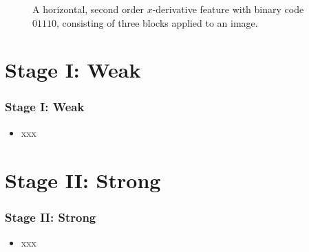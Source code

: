 \documentclass{beamer}
\begin{document}
\frame
{
	\begin{figure}[!ht]
		\centering
		\caption{A horizontal, second order $x$-derivative feature with binary code
		$01110$, consisting of three blocks applied to an image.}
		\label{fig:feature}
	\end{figure}
}

\section{Stage I: Weak}
\frame
{
  \frametitle{Stage I: Weak}
	
  \begin{itemize}
  \item <+-| alert@+> xxx
  \end{itemize}
}

\section{Stage II: Strong}
\frame
{
  \frametitle{Stage II: Strong}
	
  \begin{itemize}
  \item <+-| alert@+> xxx
  \end{itemize}
}
\end{document}
